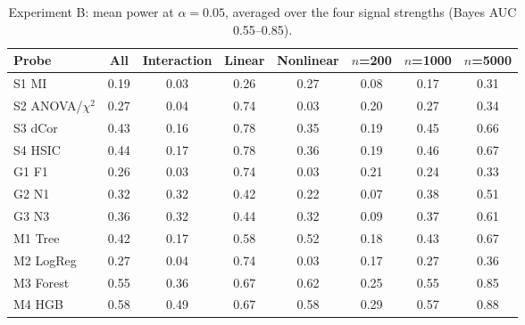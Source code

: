 \begin{table}[!t]
\centering
\caption{Experiment B: mean power at $\alpha=0.05$, averaged over the four signal strengths (Bayes AUC 0.55--0.85).}
\label{tab:power}
\footnotesize
\begin{adjustbox}{max width=\linewidth}
\begin{tabular}{lccccccc}
\hline
Probe & All & Interaction & Linear & Nonlinear & $n$=200 & $n$=1000 & $n$=5000 \\ \hline
S1 MI & 0.19 & 0.03 & 0.26 & 0.27 & 0.08 & 0.17 & 0.31 \\
S2 ANOVA/$\chi^2$ & 0.27 & 0.04 & 0.74 & 0.03 & 0.20 & 0.27 & 0.34 \\
S3 dCor & 0.43 & 0.16 & 0.78 & 0.35 & 0.19 & 0.45 & 0.66 \\
S4 HSIC & 0.44 & 0.17 & 0.78 & 0.36 & 0.19 & 0.46 & 0.67 \\
G1 F1 & 0.26 & 0.03 & 0.74 & 0.03 & 0.21 & 0.24 & 0.33 \\
G2 N1 & 0.32 & 0.32 & 0.42 & 0.22 & 0.07 & 0.38 & 0.51 \\
G3 N3 & 0.36 & 0.32 & 0.44 & 0.32 & 0.09 & 0.37 & 0.61 \\
M1 Tree & 0.42 & 0.17 & 0.58 & 0.52 & 0.18 & 0.43 & 0.67 \\
M2 LogReg & 0.27 & 0.04 & 0.74 & 0.03 & 0.17 & 0.27 & 0.36 \\
M3 Forest & 0.55 & 0.36 & 0.67 & 0.62 & 0.25 & 0.55 & 0.85 \\
M4 HGB & 0.58 & 0.49 & 0.67 & 0.58 & 0.29 & 0.57 & 0.88 \\
\hline
\end{tabular}
\end{adjustbox}
\end{table}
